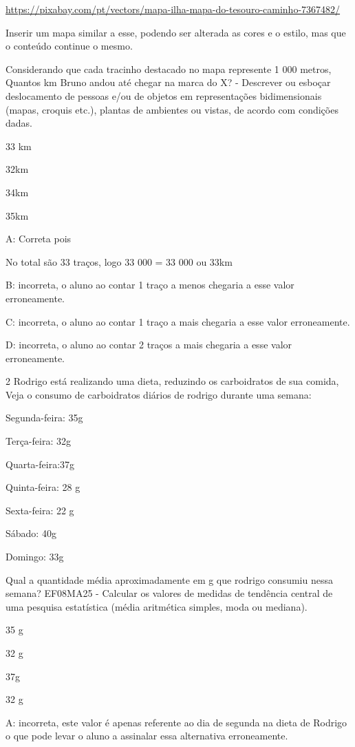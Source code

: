 \url{https://pixabay.com/pt/vectors/mapa-ilha-mapa-do-tesouro-caminho-7367482/}

Inserir um mapa similar a esse, podendo ser alterada as cores e o
estilo, mas que o conteúdo continue o mesmo.

Considerando que cada tracinho destacado no mapa represente 1 000
metros, Quantos km Bruno andou até chegar na marca do X? - Descrever ou
esboçar deslocamento de pessoas e/ou de objetos em representações
bidimensionais (mapas, croquis etc.), plantas de ambientes ou vistas, de
acordo com condições dadas.

\item 33 km
\item 32km
\item 34km
\item 35km

A: Correta pois

No total são 33 traços, logo 33 000 = 33 000 ou 33km

B: incorreta, o aluno ao contar 1 traço a menos chegaria a esse valor
erroneamente.

C: incorreta, o aluno ao contar 1 traço a mais chegaria a esse valor
erroneamente.

D: incorreta, o aluno ao contar 2 traços a mais chegaria a esse valor
erroneamente.

\num{2} Rodrigo está realizando uma dieta, reduzindo os carboidratos de sua
comida, Veja o consumo de carboidratos diários de rodrigo durante uma
semana:

Segunda-feira: 35g

Terça-feira: 32g

Quarta-feira:37g

Quinta-feira: 28 g

Sexta-feira: 22 g

Sábado: 40g

Domingo: 33g

Qual a quantidade média aproximadamente em g que rodrigo consumiu nessa
semana? EF08MA25 - Calcular os valores de medidas de tendência central
de uma pesquisa estatística (média aritmética simples, moda ou mediana).

\item 35 g
\item 32 g
\item 37g
\item 32 g

A: incorreta, este valor é apenas referente ao dia de segunda na dieta
de Rodrigo o que pode levar o aluno a assinalar essa alternativa
erroneamente.

